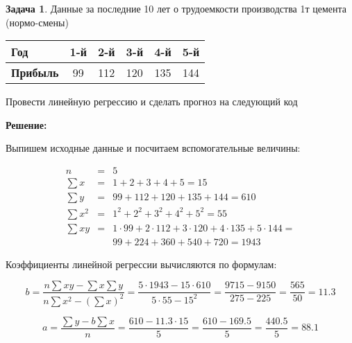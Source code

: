 \documentclass[a4paper,11pt]{article}
\newenvironment{shdd}{\begin{mdframed}[backgroundcolor=shadecolor]}{\end{mdframed}}
\theoremstyle{definition}
\newtheorem{problem}{Задача}\setlength{\parindent}{0pt}
\newenvironment{solution}
{\begin{shdd}
     \textbf{Решение:}\par\setlength{\parindent}{0pt}}
     {
\end{shdd}}
\begin{document}
    \newpage
    \begin{problem}
        Данные за последние 10 лет о трудоемкости производства 1т цемента (нормо-смены)

        \begin{table}[H]
        \centering
        \begin{adjustbox}{max width=\textwidth}
            \begin{tabular}{l c c c c c}
                \toprule
                \textbf{Год} & 1-й & 2-й & 3-й & 4-й & 5-й \\
                \midrule
                \textbf{Прибыль} & 99 & 112 & 120 & 135 & 144 \\
                \bottomrule
            \end{tabular}
        \end{adjustbox}\label{tab:table2}
        \end{table}

        Провести линейную регрессию и сделать прогноз на следующий код

        \begin{solution}
            Выпишем исходные данные и посчитаем вспомогательные величины:

            \[
            \begin{array}{lcl}
            n &=& 5 \\
            \sum x &=& 1 + 2 + 3 + 4 + 5 = 15 \\
            \sum y &=& 99 + 112 + 120 + 135 + 144 = 610 \\
            \sum x^2 &=& 1^2 + 2^2 + 3^2 + 4^2 + 5^2 = 55 \\
            \sum xy &=& 1\cdot99 + 2\cdot112 + 3\cdot120 + 4\cdot135 + 5\cdot144 = \\
            && 99 + 224 + 360 + 540 + 720 = 1943
            \end{array}
            \]

            Коэффициенты линейной регрессии вычисляются по формулам:

            \[
            b = \frac{n \sum xy - \sum x \sum y}{n \sum x^2 - (\sum x)^2}
            = \frac{5 \cdot 1943 - 15 \cdot 610}{5 \cdot 55 - 15^2}
            = \frac{9715 - 9150}{275 - 225}
            = \frac{565}{50} = 11.3
            \]

            \[
            a = \frac{\sum y - b \sum x}{n}
            = \frac{610 - 11.3 \cdot 15}{5}
            = \frac{610 - 169.5}{5}
            = \frac{440.5}{5} = 88.1
            \]


\end{solution}
\end{problem}
\end{document}
